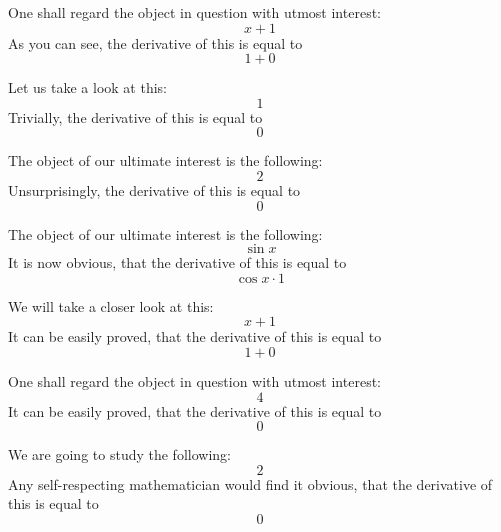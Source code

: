 \documentclass{article}
\begin{document}
One shall regard the object in question with utmost interest:
\begin{equation}
x + 1 
\end{equation}
As you can see, the derivative of this is equal to
\begin{equation}
1 + 0 
\end{equation}

Let us take a look at this:
\begin{equation}
1 
\end{equation}
Trivially, the derivative of this is equal to
\begin{equation}
0 
\end{equation}

The object of our ultimate interest is the following:
\begin{equation}
2 
\end{equation}
Unsurprisingly, the derivative of this is equal to
\begin{equation}
0 
\end{equation}

The object of our ultimate interest is the following:
\begin{equation}
\sin x 
\end{equation}
It is now obvious, that the derivative of this is equal to
\begin{equation}
\cos x \cdot 1 
\end{equation}

We will take a closer look at this:
\begin{equation}
x + 1 
\end{equation}
It can be easily proved, that the derivative of this is equal to
\begin{equation}
1 + 0 
\end{equation}

One shall regard the object in question with utmost interest:
\begin{equation}
4 
\end{equation}
It can be easily proved, that the derivative of this is equal to
\begin{equation}
0 
\end{equation}

We are going to study the following:
\begin{equation}
2 
\end{equation}
Any self-respecting mathematician would find it obvious, that the derivative of this is equal to
\begin{equation}
0 
\end{equation}
\end{document}
